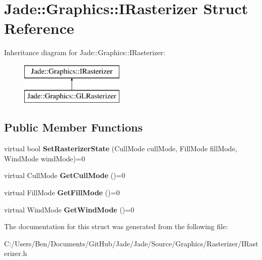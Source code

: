 \hypertarget{struct_jade_1_1_graphics_1_1_i_rasterizer}{}\section{Jade\+:\+:Graphics\+:\+:I\+Rasterizer Struct Reference}
\label{struct_jade_1_1_graphics_1_1_i_rasterizer}
Inheritance diagram for Jade\+:\+:Graphics\+:\+:I\+Rasterizer\+:\begin{figure}[H]
\begin{center}
\leavevmode
\includegraphics[height=2.000000cm]{struct_jade_1_1_graphics_1_1_i_rasterizer}
\end{center}
\end{figure}
\subsection*{Public Member Functions}
\begin{DoxyCompactItemize}
\item 
\hypertarget{struct_jade_1_1_graphics_1_1_i_rasterizer_ad4468a86259269268a355c22d264a321}{}virtual bool {\bfseries Set\+Rasterizer\+State} (Cull\+Mode cull\+Mode, Fill\+Mode fill\+Mode, Wind\+Mode wind\+Mode)=0\label{struct_jade_1_1_graphics_1_1_i_rasterizer_ad4468a86259269268a355c22d264a321}

\item 
\hypertarget{struct_jade_1_1_graphics_1_1_i_rasterizer_a5ddb923d5483ce8a828ac52c9e973fd6}{}virtual Cull\+Mode {\bfseries Get\+Cull\+Mode} ()=0\label{struct_jade_1_1_graphics_1_1_i_rasterizer_a5ddb923d5483ce8a828ac52c9e973fd6}

\item 
\hypertarget{struct_jade_1_1_graphics_1_1_i_rasterizer_a021a3c1e717233a8b3d14544a8ac0292}{}virtual Fill\+Mode {\bfseries Get\+Fill\+Mode} ()=0\label{struct_jade_1_1_graphics_1_1_i_rasterizer_a021a3c1e717233a8b3d14544a8ac0292}

\item 
\hypertarget{struct_jade_1_1_graphics_1_1_i_rasterizer_a5476593dede64f5fd1b03ed61c2d58dd}{}virtual Wind\+Mode {\bfseries Get\+Wind\+Mode} ()=0\label{struct_jade_1_1_graphics_1_1_i_rasterizer_a5476593dede64f5fd1b03ed61c2d58dd}

\end{DoxyCompactItemize}


The documentation for this struct was generated from the following file\+:\begin{DoxyCompactItemize}
\item 
C\+:/\+Users/\+Ben/\+Documents/\+Git\+Hub/\+Jade/\+Jade/\+Source/\+Graphics/\+Rasterizer/I\+Rasterizer.\+h\end{DoxyCompactItemize}
